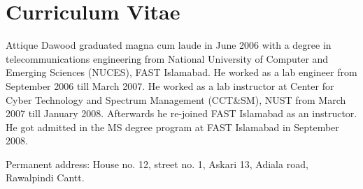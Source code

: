 
\chapter*{Curriculum Vitae}

Attique Dawood graduated magna cum laude in June 2006 with a degree in telecommunications
engineering from National University of Computer and Emerging Sciences (NUCES), FAST Islamabad.
He worked as a lab engineer from September 2006 till March 2007. He worked as a lab instructor
at Center for Cyber Technology and Spectrum Management (CCT\&SM), NUST from March 2007 till
January 2008. Afterwards he re-joined FAST Islamabad as an instructor. He got admitted in the 
MS degree program at FAST Islamabad in September 2008.

\medskip

\noindent
Permanent address: House no. 12, street no. 1, Askari 13, Adiala road, Rawalpindi Cantt.

\vfill



